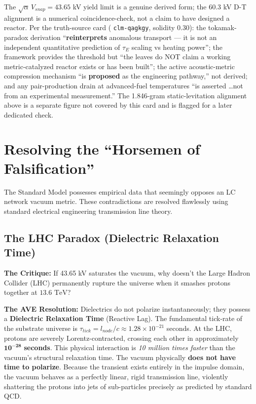 \begin{tcolorbox}[colback=white, colframe=black, title=\textbf{Scope: mechanistic reinterpretation, not a quantitative fusion prediction}]
The $\sqrt{\alpha}\,V_{snap} = 43.65$ kV yield limit is a genuine derived form; the $60.3$ kV D-T alignment is a numerical coincidence-check, not a claim to have designed a reactor. Per the truth-source card ( \texttt{clm-qagkgy}, solidity 0.30): the tokamak-paradox derivation ``\textbf{reinterprets} anomalous transport --- it is not an independent quantitative prediction of $\tau_E$ scaling vs heating power''; the framework provides the threshold but ``the leaves do NOT claim a working metric-catalyzed reactor exists or has been built''; the active acoustic-metric compression mechanism ``is \textbf{proposed} as the engineering pathway,'' not derived; and any pair-production drain at advanced-fuel temperatures ``is asserted \dots not from an experimental measurement.'' The 1.846-gram static-levitation alignment above is a separate figure not covered by this card and is flagged for a later dedicated check.
\end{tcolorbox}

\section{Resolving the ``Horsemen of Falsification''}
The Standard Model possesses empirical data that seemingly opposes an LC network vacuum metric. These contradictions are resolved flawlessly using standard electrical engineering transmission line theory.

\subsection{The LHC Paradox (Dielectric Relaxation Time)}
\textbf{The Critique:} If 43.65 kV saturates the vacuum, why doesn't the Large Hadron Collider (LHC) permanently rupture the universe when it smashes protons together at $13.6 \text{ TeV}$? 

\textbf{The AVE Resolution:} Dielectrics do not polarize instantaneously; they possess a \textbf{Dielectric Relaxation Time} (Reactive Lag). The fundamental tick-rate of the substrate universe is $\tau_{tick} = l_{node} / c \approx 1.28 \times 10^{-21}$ seconds. 
At the LHC, protons are severely Lorentz-contracted, crossing each other in approximately $\mathbf{10^{-28}}$ \textbf{seconds}. This physical interaction is \textit{10 million times faster} than the vacuum's structural relaxation time. 
The vacuum physically \textbf{does not have time to polarize}. Because the transient exists entirely in the impulse domain, the vacuum behaves as a perfectly linear, rigid transmission line, violently shattering the protons into jets of sub-particles precisely as predicted by standard QCD. 

